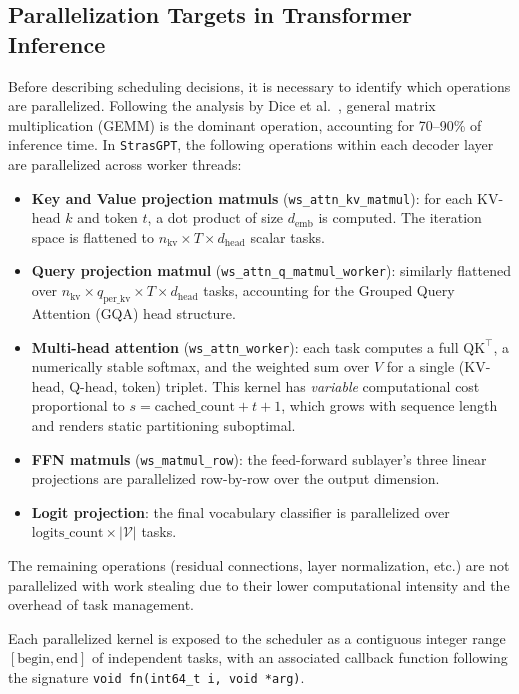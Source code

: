 \documentclass[11pt,english]{article}
\begin{document}
\subsection{Parallelization Targets in Transformer Inference}
 
Before describing scheduling decisions, it is necessary to identify which operations are parallelized. Following the analysis by Dice et al.~\cite{dice2021transformercpu}, general matrix multiplication (GEMM) is the dominant operation, accounting for 70--90\% of inference time. In \texttt{StrasGPT}, the following operations within each decoder layer are parallelized across worker threads:
 
\begin{itemize}
    \item \textbf{Key and Value projection matmuls} (\texttt{ws\_attn\_kv\_matmul}): for each KV-head $k$ and token $t$, a dot product of size $d_{\text{emb}}$ is computed. The iteration space is flattened to $n_{\text{kv}} \times T \times d_{\text{head}}$ scalar tasks.
    \item \textbf{Query projection matmul} (\texttt{ws\_attn\_q\_matmul\_worker}): similarly flattened over $n_{\text{kv}} \times q_{\text{per\_kv}} \times T \times d_{\text{head}}$ tasks, accounting for the Grouped Query Attention (GQA) head structure.
    \item \textbf{Multi-head attention} (\texttt{ws\_attn\_worker}): each task computes a full $\text{QK}^\top$, a numerically stable softmax, and the weighted sum over $V$ for a single (KV-head, Q-head, token) triplet. This kernel has \emph{variable} computational cost proportional to $s = \text{cached\_count} + t + 1$, which grows with sequence length and renders static partitioning suboptimal.
    \item \textbf{FFN matmuls} (\texttt{ws\_matmul\_row}): the feed-forward sublayer's three linear projections are parallelized row-by-row over the output dimension.
    \item \textbf{Logit projection}: the final vocabulary classifier is parallelized over $\text{logits\_count} \times |\mathcal{V}|$ tasks.
\end{itemize}
 
The remaining operations (residual connections, layer normalization, etc.) are not parallelized with work stealing due to their lower computational intensity and the overhead of task management.

\noindent Each parallelized kernel is exposed to the scheduler as a contiguous integer range $[\text{begin}, \text{end}]$ of independent tasks, with an associated callback function following the signature \texttt{void fn(int64\_t i, void *arg)}.
 
\end{document}
